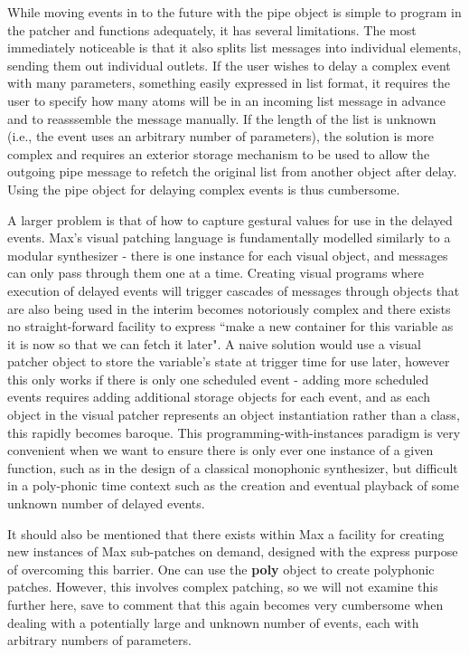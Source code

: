 \documentclass[acmsmall]{acmart}
\begin{document}
While moving events in to the future with the pipe object is simple to program 
in the patcher and functions adequately, 
it has several limitations. The most immediately noticeable is that it also splits 
list messages into individual elements, sending them out individual outlets. 
If the user wishes to delay a complex event with many parameters, something easily 
expressed in list format, it requires the user to specify how many atoms will 
be in an incoming list message in advance and to reasssemble the message manually.
If the length of the list is unknown (i.e., the event uses an arbitrary number
of parameters), the solution is more complex and requires 
an exterior storage mechanism to be used to allow the outgoing 
pipe message to refetch the original list from another object after delay. Using
the pipe object for delaying complex events is thus cumbersome. 

A larger problem is that of how to capture gestural values for use in the delayed
events. Max's visual patching language is fundamentally modelled similarly to a modular
synthesizer - there is one instance for each visual object, and messages can only
pass through them one at a time. Creating visual programs where execution of 
delayed events will trigger cascades of messages through objects that are also 
being used in the interim becomes notoriously complex and there exists no straight-forward
facility to express ``make a new container for this variable as it is now so that
we can fetch it later". A naive solution would use a visual patcher object to store 
the variable's state at trigger time for use later, however this only works
if there is only one scheduled event - adding more scheduled events requires adding
additional storage objects for each event, and as each object in the visual patcher
represents an object instantiation rather than a class, this rapidly becomes
baroque. This programming-with-instances paradigm
is very convenient when we want to ensure there is only ever one instance of a given function, such
as in the design of a classical monophonic synthesizer, but difficult in a poly-phonic time context
such as the creation and eventual playback of some unknown number of delayed events.


It should also be mentioned that there exists within Max a facility for creating
new instances of Max sub-patches on demand, designed with the express purpose of
overcoming this barrier. One can use the \textbf{poly} object to create polyphonic
patches. However, this involves complex patching, so we will not examine this further here,
save to comment that this again becomes very cumbersome when dealing
with a potentially large and unknown number of events, each with arbitrary numbers
of parameters.
\end{document}
